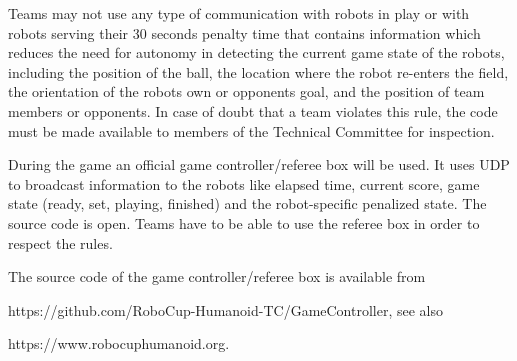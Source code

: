 \bigskip


Teams may not use any type of communication
with robots in play or with robots serving their 30 seconds penalty
time that contains information which reduces the need for autonomy in detecting
the current game state of the robots, including the position of the ball,
the location where the robot re-enters the field,
the orientation of the robots own or opponents goal,
and the position of team members or opponents.
In case of doubt that a team violates this rule,
the code must be made available to members of the Technical Committee for inspection.

\bigskip

During the game an official game controller/referee box will be used.
It uses UDP to broadcast information to the robots like elapsed time,
current score, game state (ready, set, playing, finished) and the robot-specific
penalized state. The source code is open.
Teams have to be able to use the referee box in order to respect the rules.



\bigskip


The source code of the game controller/referee box is available from

\textcolor[rgb]{0.0,0.0,0.49803922}{https://github.com/RoboCup-Humanoid-TC/GameController},
see also 

\textcolor[rgb]{0.0,0.0,0.49803922}{https://www.robocuphumanoid.org}.

